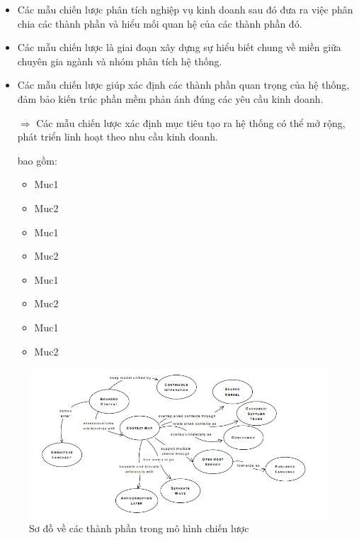 \begin{itemize}

\item Các mẫu chiến lược phân tích nghiệp vụ kinh doanh sau đó đưa ra việc phân chia các thành phần và hiểu mối quan hệ của các thành phần đó.

\item Các mẫu chiến lược là giai đoạn xây dựng sự hiểu biết chung về miền giữa chuyên gia ngành và nhóm phân tích hệ thống.

\item Các mẫu chiến lược giúp xác định các thành phần quan trọng của hệ thống, đảm bảo kiến trúc phần mềm phản ánh đúng các yêu cầu kinh doanh.

$\Rightarrow$ Các mẫu chiến lược xác định mục tiêu tạo ra hệ thống có thể mở rộng, phát triển linh hoạt theo nhu cầu kinh doanh.

bao gồm:

\begin{itemize}

\item Muc1 %

\item Muc2 %

\item Muc1 %

\item Muc2 %

\item Muc1 %

\item Muc2 %

\item Muc1 %

\item Muc2 %

\end{itemize}


\end{itemize}

\begin{figure}[H]

\centering

\includegraphics[scale = 0.9]{pictures/cac_mau_chien_luoc/temp.png}

\caption{Sơ đồ về các thành phần trong mô hình chiến lược}

\end{figure}


